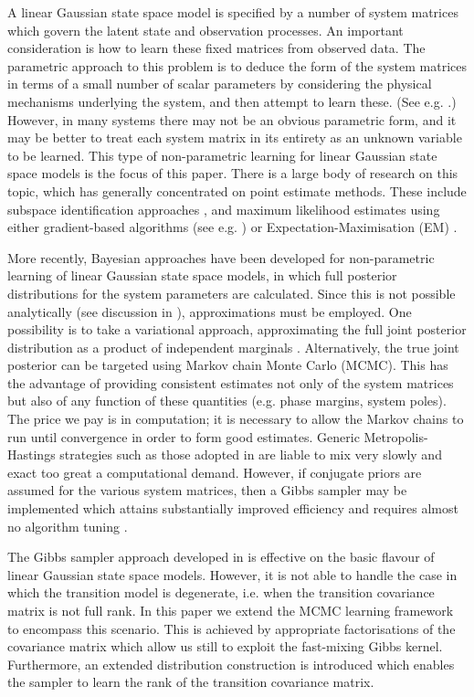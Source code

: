 \documentclass[journal,10pt]{IEEEtran}
\begin{document}
A linear Gaussian state space model is specified by a number of system matrices which govern the latent state and observation processes. An important consideration is how to learn these fixed matrices from observed data. The parametric approach to this problem is to deduce the form of the system matrices in terms of a small number of scalar parameters by considering the physical mechanisms underlying the system, and then attempt to learn these. (See e.g. \cite{Kantas2009,Andrieu2010}.) However, in many systems there may not be an obvious parametric form, and it may be better to treat each system matrix in its entirety as an unknown variable to be learned. This type of non-parametric learning for linear Gaussian state space models is the focus of this paper. There is a large body of research on this topic, which has generally concentrated on point estimate methods. These include subspace identification approaches \cite{VanOverschee1991,Viberg1995}, and maximum likelihood estimates using either gradient-based algorithms (see e.g. \cite{Cappe2005,Sarkka2013}) or Expectation-Maximisation (EM) \cite{Shumway1982,Digalakis1993,Ghahramani1996,Gibson2005,Li2009}.

More recently, Bayesian approaches have been developed for non-parametric learning of linear Gaussian state space models, in which full posterior distributions for the system parameters are calculated. Since this is not possible analytically (see discussion in \cite{Beal2003}), approximations must be employed. One possibility is to take a variational approach, approximating the full joint posterior distribution as a product of independent marginals \cite{Ghahramani2001,Beal2003,Barber2007}. Alternatively, the true joint posterior can be targeted using Markov chain Monte Carlo (MCMC). This has the advantage of providing consistent estimates not only of the system matrices but also of any function of these quantities (e.g. phase margins, system poles). The price we pay is in computation; it is necessary to allow the Markov chains to run until convergence in order to form good estimates. Generic Metropolis-Hastings strategies such as those adopted in \cite{Ninness2010} are liable to mix very slowly and exact too great a computational demand. However, if conjugate priors are assumed for the various system matrices, then a Gibbs sampler may be implemented which attains substantially improved efficiency and requires almost no algorithm tuning \cite{Wills2012}.

The Gibbs sampler approach developed in \cite{Wills2012} is effective on the basic flavour of linear Gaussian state space models. However, it is not able to handle the case in which the transition model is degenerate, i.e. when the transition covariance matrix is not full rank. In this paper we extend the MCMC learning framework to encompass this scenario. This is achieved by appropriate factorisations of the covariance matrix which allow us still to exploit the fast-mixing Gibbs kernel. Furthermore, an extended distribution construction is introduced which enables the sampler to learn the rank of the transition covariance matrix.
\end{document}
